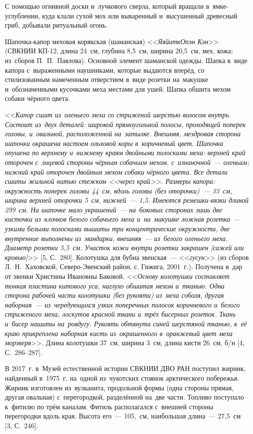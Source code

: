 С помощью огнивной доски и~лучкового сверла, который вращали в~ямке-углублении, куда клали сухой мох или вываренный и~высушенный древесный гриб, добывали ритуальный огонь.

Шапочка-капор меховая корякская (шаманская) <<\textit{ЯяйиткОпэн Кэн}>> (СВКНИИ КП-12, длина 24~см, глубина 8,5~см, ширина 20,5~см, мех, кожа; из~сборов П.~П.~Павлова). Основной элемент шаманской одежды. Шапка в~виде капора с~выраженными наушниками, которые выдаются вперёд, со стилизованным намеченным отверстием в~виде розетки на~макушке и~обозначенными кусочками меха местами для ушей. Шапка обшита мехом собаки чёрного цвета.

<<\textit{Капор сшит из~оленьего меха со стриженой шерстью волосом внутрь. Состоит из~двух деталей: широкой прямоугольной полосы, проходящей поперек головы, и~овальной, расположенной на~затылке. Внешняя, мездровая сторона шапочки окрашена настоем ольховой коры в~коричневый цвет. Шапочка опушена по верхнему и~нижнему краям двойными полосками меха: верхней край оторочен с~лицевой стороны чёрным собачьим мехом, с~изнаночной~--- оленьим; нижний край оторочен двойным мехом собаки чёрного цвета. Все детали сшиты жильной нитью стежком <<\textit{через край}>>. Размеры капора: окружность поперек головы 44~см, вдоль головы (без оторочки)~--- 33~см, ширина верхней оторочки 5~см, нижней~--- 1,5. Имеются ремешки-вязки длиной 299~см. На шапочке мало украшений~--- на~боковых сторонах лишь две кисточки из~клочков белого собачьего меха и~на~макушке ложная розетка~--- узкими белыми полосками вышиты три концентрические окружности, две внутренние выполнены из~мандарки, внешняя~--- из~белого оленьего меха. Диаметр розетки 5,5~см. Участок кожи внутри розетки закрашен [сажей или кровью]}>> [5, С.~280].
\clearpage
Колотушка для бубна эвенская~--- <<\textit{гусун}>> (из сборов Л.~Н.~Хаховской, Северо-Эвенский район, с. Гижига, 2001~г.). Получена в~дар от эвенки Христины Ивановны Баковой. <<\textit{Основу колотушки составляет тонкая пластина китового уса, наглухо обшитая мехом и~тканью. Одна сторона рабочей части колотушки (без рукояти) из~меха соболя, другая наборная~--- из~чередующихся узких поперечных полосок коричневого и~белого стриженого меха, лоскутов красной ткани и~трёх бисерных розеток. Ткань и~бисер нашиты на~ровдугу. Рукоять обтянута синей шерстяной тканью, к~её краю прикреплена наборная кисть из~окрашенного в~оранжевый цвет меха морзверя}>>. Длина колотушки 37~см, ширина 3~см, длина кисти 26~см, б/н [4, С.~286--287].

В 2017~г. в~Музей естественной истории СВКНИИ ДВО РАН поступил жирник, найденный в~1975~г. на~одной из~чукотских стоянок арктического побережья. Жирник изготовлен из~вулканита, продольной формы (одна стороны прямая, другая овальная) с~перегородкой, разделённой на~две части. Топливо поступало к~фитилю по трём каналам. Фитиль располагался с~внешней стороны перегородки вдоль края. Высота его~--- 105,~см, наибольшая длина~--- 27,5~см [3, С.~246].

